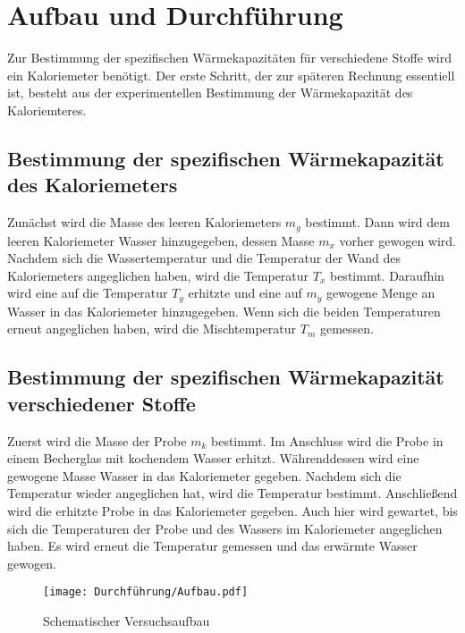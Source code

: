 \section{Aufbau und Durchführung}
Zur Bestimmung der spezifischen Wärmekapazitäten für verschiedene Stoffe wird ein Kaloriemeter benötigt.
Der erste Schritt, der zur späteren Rechnung essentiell ist, besteht aus der experimentellen Bestimmung der Wärmekapazität des Kaloriemteres.

\subsection{Bestimmung der spezifischen Wärmekapazität des Kaloriemeters}
Zunächst wird die Masse des leeren Kaloriemeters $m_g$ bestimmt.
Dann wird dem leeren Kaloriemeter Wasser hinzugegeben, dessen Masse $m_x$ vorher gewogen wird.
Nachdem sich die Wassertemperatur und die Temperatur der Wand des Kaloriemeters angeglichen haben, wird die Temperatur $T_x$ bestimmt.
Daraufhin wird eine auf die Temperatur $T_y$ erhitzte und eine auf $m_y$ gewogene Menge an Wasser in das Kaloriemeter hinzugegeben.
Wenn sich die beiden Temperaturen erneut angeglichen haben, wird die Mischtemperatur $T_m$ gemessen.

\subsection{Bestimmung der spezifischen Wärmekapazität verschiedener Stoffe}
Zuerst wird die Masse der Probe $m_k$ bestimmt.
Im Anschluss wird die Probe in einem Becherglas mit kochendem Wasser erhitzt.
Währenddessen wird eine gewogene Masse Wasser in das Kaloriemeter gegeben.
Nachdem sich die Temperatur wieder angeglichen hat, wird die Temperatur bestimmt.
Anschließend wird die erhitzte Probe in das Kaloriemeter gegeben.
Auch hier wird gewartet, bis sich die Temperaturen der Probe und des Wassers im Kaloriemeter angeglichen haben.
Es wird erneut die Temperatur gemessen und das erwärmte Wasser gewogen.

\begin{figure}
    \centering
    \texttt{[image: Durchführung/Aufbau.pdf]}
    \caption{Schematischer Versuchsaufbau}
    \label{fig:Aufbau}
\end{figure}
